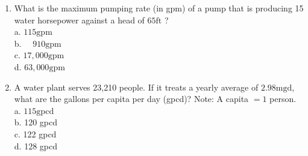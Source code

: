 \documentclass[10pt]{article}
\begin{document}
\begin{enumerate}
  \item What is the maximum pumping rate (in gpm) of a pump that is producing 15 water horsepower against a head of $65 \mathrm{ft}$ ?\\
a. $115 \mathrm{gpm}$\\
b. $\quad 910 \mathrm{gpm}$\\
c. $17,000 \mathrm{gpm}$\\
d. $63,000 \mathrm{gpm}$

  \item A water plant serves 23,210 people. If it treats a yearly average of $2.98 \mathrm{mgd}$, what are the gallons per capita per day (gpcd)? Note: A capita $=1$ person.\\
a. $115 \mathrm{gpcd}$\\
b. 120 gpcd\\
c. 122 gpcd\\
d. 128 gpcd

\end{enumerate}
\end{document}
